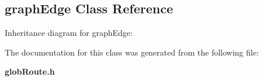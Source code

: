 \subsection{graph\-Edge  Class Reference}
\label{graphEdge}
Inheritance diagram for graph\-Edge:\begin{figure}[H]
\begin{center}
\leavevmode
\setlength{\epsfysize}{2cm}
\end{center}
\end{figure}


The documentation for this class was generated from the following file:\begin{CompactItemize}
\item 
{\bf glob\-Route.h}\end{CompactItemize}
